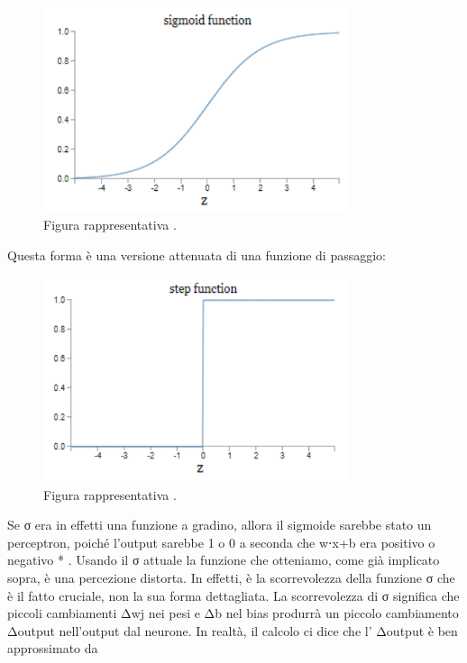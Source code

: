 \begin{figure}
\includegraphics[width=%
0.8\textwidth]{figures/fig10}
\caption[Sigmoid function.]{Figura rappresentativa .
\label{fig:myInlineFigure}}
\end{figure}

Questa forma è una versione attenuata di una funzione di passaggio:

\begin{figure}
\includegraphics[width=%
0.8\textwidth]{figures/fig11}
\caption[Step function.]{Figura rappresentativa .
\label{fig:myInlineFigure}}
\end{figure}

Se σ era in effetti una funzione a gradino, allora il sigmoide sarebbe stato un perceptron, poiché l'output sarebbe 1 o 0 a seconda che w⋅x+b era positivo o negativo * . Usando il σ attuale la funzione che otteniamo, come già implicato sopra, è una percezione distorta. In effetti, è la scorrevolezza della funzione σ che è il fatto cruciale, non la sua forma dettagliata. La scorrevolezza di σ significa che piccoli cambiamenti Δwj nei pesi e Δb nel bias produrrà un piccolo cambiamento Δoutput nell'output dal neurone. In realtà, il calcolo ci dice che l' Δoutput è ben approssimato da

